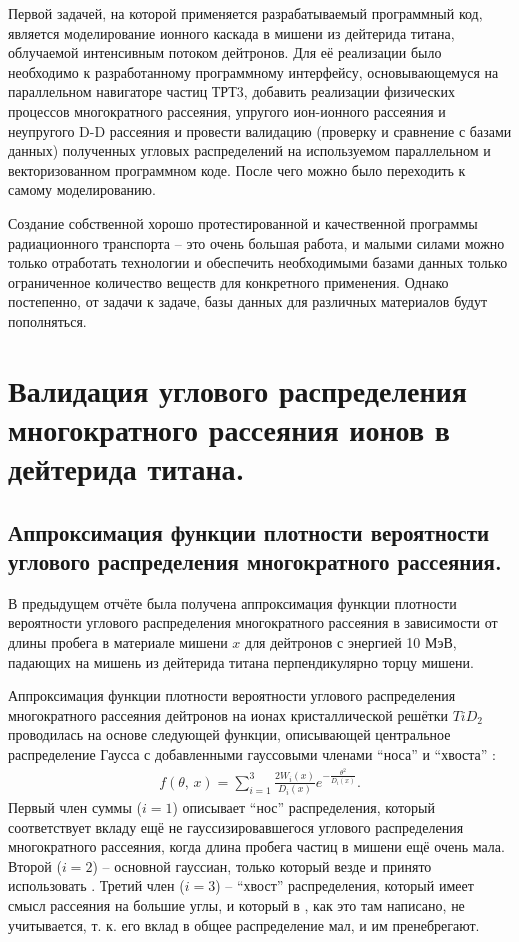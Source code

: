 \documentclass[a4paper,12pt]{article}
\begin{document}
\begin{large}
    Первой задачей, на которой применяется разрабатываемый программный код, является моделирование ионного каскада в мишени из дейтерида титана, облучаемой интенсивным потоком дейтронов.
    Для её реализации было необходимо к разработанному программному интерфейсу, основывающемуся на параллельном навигаторе частиц ТРТ3, добавить реализации физических процессов многократного рассеяния, упругого ион-ионного рассеяния и неупругого D-D рассеяния и провести валидацию (проверку и сравнение с базами данных) полученных угловых распределений на используемом параллельном и векторизованном программном коде.
    После чего можно было переходить к самому моделированию. 
   
   Создание собственной хорошо протестированной и качественной программы радиационного транспорта -- это очень большая работа, и малыми силами можно только отработать технологии и обеспечить необходимыми базами данных только ограниченное количество веществ для конкретного применения.
   Однако постепенно, от задачи к задаче, базы данных для различных материалов будут пополняться.
   
   
\clearpage{}
\section{Валидация углового распределения многократного рассеяния ионов в дейтерида титана.}
\label{ValMS}

\subsection{Аппроксимация функции плотности вероятности углового распределения многократного рассеяния.}
\label{subValMS1}

	В предыдущем отчёте \cite{70/778-T} была получена аппроксимация функции плотности вероятности углового распределения многократного рассеяния в зависимости от длины пробега в материале мишени $x$ для дейтронов с энергией 10 МэВ, падающих на мишень из дейтерида титана перпендикулярно торцу мишени.
 
	Аппроксимация функции плотности вероятности углового распределения многократного рассеяния дейтронов на ионах кристаллической решётки $TiD_2$ проводилась на основе следующей функции, описывающей центральное распределение Гаусса с добавленными гауссовыми членами ``носа'' и ``хвоста'' \cite{70/778-T}:
\begin{equation}
\label{MSApproximationFunction}
\begin{aligned} 
  f(\theta,\,x)=\sum_{i=1}^{3} \frac{2W_i(x)}{D_i(x)}e^{-\frac{\theta^2}{D_i(x)}}.
\end{aligned}
\end{equation}
  	Первый член суммы ($i=1$) описывает ``нос'' распределения, который соответствует вкладу ещё не гауссизировавшегося углового распределения многократного рассеяния, когда длина пробега частиц в мишени ещё очень мала.
  	Второй ($i=2$) -- основной гауссиан, только который везде и принято использовать \cite{PDG}.
  	Третий член ($i=3$) --  ``хвост'' распределения, который имеет смысл рассеяния на большие углы, и который в \cite{PDG}, как это там написано, не учитывается, т. к. его вклад в общее распределение мал, и им пренебрегают.
  

\end{large}
\end{document}
